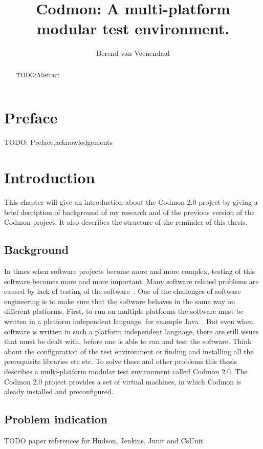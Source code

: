 \documentclass[a4paper,10pt]{scrartcl}
\title{Codmon: A multi-platform modular test environment.}
\author{Berend van Veenendaal}
\newcommand{\project}{Codmon 2.0}
\begin{document}
\maketitle

\begin{abstract}
TODO:Abstract
\end{abstract}
\newpage
\section*{Preface}
\label{sec:Preface}
TODO: Preface,acknowledgements
\newpage
\tableofcontents
\newpage

\section{Introduction}
\label{sec:Introduction}
This chapter will give an introduction about the \project{} project by giving a brief decription of background of my research and of the
previous version of the Codmon project. It also describes the structure of the reminder of this thesis.

\subsection{Background}
\label{sec:Background}
In times when software projects become more and more complex, testing of this software becomes more and more important. Many software
related problems are caused by lack of testing of the software~\cite{TTCST}. One of the challenges of software engineering is to make
sure that the software behaves in the same way on different platforms. First, to run on multiple platforms the software must be written in a
platform independent language, for example Java~\cite{Java}. But even when software is written in such a platform independent language, there 
are still issues that must be dealt with, before one is able to run and test the software. Think about the configuration of the test environment 
or finding and installing all the prerequisite libraries etc etc. To solve these and other problems this thesis describes a multi-platform modular
test environment called \project{}. The \project{} project provides a set of virtual machines, in which Codmon is aleady installed and
preconfigured.

\subsection{Problem indication}
\label{subsec:Problemindication}
TODO paper references for Hudson, Jenkins, Junit and CsUnit 
\end{document}
